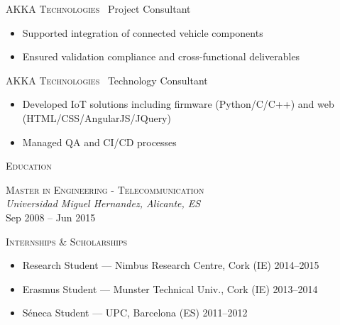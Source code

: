 \documentclass[11pt, a4paper]{article}
\newcommand{\headright}[1]{\vspace*{2ex}\textsc{\large\color{cvblue}#1}\par%
  \vspace*{-1.4ex}{\color{cvblue}\hrulefill}\par}
\newlength{\SideBarW}
\newlength{\BetweenJobsGap}
\newenvironment{job}[3]{%
  \vspace{\BetweenJobsGap}%
  \noindent\textsc{#1} \textemdash\ #2\hfill
  \begin{itemize}[leftmargin=1.4em,label=--,labelsep=0.5em,itemsep=0.45ex,topsep=0.2ex]
}{%
  \end{itemize}%
}
\begin{document}
\begin{minipage}[t]{\dimexpr\textwidth-\SideBarW-3mm\relax}
  \begin{job}{AKKA Technologies}{Project Consultant}{Dec 2017 -- Mar 2019}
    \item Supported integration of connected vehicle components
    \item Ensured validation compliance and cross-functional deliverables
  \end{job}

  \begin{job}{AKKA Technologies}{Technology Consultant}{Oct 2015 -- Dec 2017}
    \item Developed IoT solutions including firmware (Python/C/C++) and web (HTML/CSS/AngularJS/JQuery)
    \item Managed QA and CI/CD processes
  \end{job}

  \headright{Education}
  \noindent\textsc{Master in Engineering - Telecommunication} \\
  \textit{Universidad Miguel Hernandez, Alicante, ES} \\
  Sep 2008 -- Jun 2015

  \headright{Internships \& Scholarships}
  \begin{itemize}[leftmargin=1.2em,label=--,labelsep=0.5em,itemsep=0.4ex,topsep=0.2ex]
    \item Research Student --- Nimbus Research Centre, Cork (IE) \hfill 2014--2015
    \item Erasmus Student --- Munster Technical Univ., Cork (IE) \hfill 2013--2014
    \item Séneca Student --- UPC, Barcelona (ES) \hfill 2011--2012
  \end{itemize}
\end{minipage}
\end{document}
